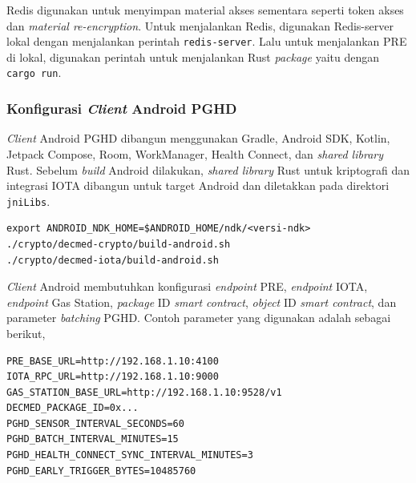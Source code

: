 

Redis digunakan untuk menyimpan material akses sementara seperti token akses dan \textit{material re-encryption}. 
Untuk menjalankan Redis, digunakan Redis-server lokal dengan menjalankan perintah \texttt{redis-server}.
Lalu untuk menjalankan PRE di lokal, digunakan perintah untuk menjalankan Rust \textit{package} yaitu dengan \texttt{cargo run}.

\subsubsection{Konfigurasi \textit{Client} Android PGHD}

\textit{Client} Android PGHD dibangun menggunakan Gradle, Android SDK, Kotlin, Jetpack Compose, Room, WorkManager, Health Connect, dan \textit{shared library} Rust. 
Sebelum \textit{build} Android dilakukan, \textit{shared library} Rust untuk kriptografi dan integrasi IOTA dibangun untuk target Android dan diletakkan pada direktori \texttt{jniLibs}.

\begin{lstlisting}[caption={\textit{Build} \textit{Shared Library} Rust untuk Android}, label={lst:build-shared-library-android}, float=htb]
export ANDROID_NDK_HOME=$ANDROID_HOME/ndk/<versi-ndk>
./crypto/decmed-crypto/build-android.sh
./crypto/decmed-iota/build-android.sh
\end{lstlisting}

\textit{Client} Android membutuhkan konfigurasi \textit{endpoint} PRE, \textit{endpoint} IOTA, \textit{endpoint} Gas Station, \textit{package} ID \textit{smart contract}, \textit{object} ID \textit{smart contract}, dan parameter \textit{batching} PGHD\@.
Contoh parameter yang digunakan adalah sebagai berikut,

\begin{lstlisting}[caption={Konfigurasi \textit{client} Android PGHD}, label={lst:konfigurasi-android-pghd}, float=htb]
PRE_BASE_URL=http://192.168.1.10:4100
IOTA_RPC_URL=http://192.168.1.10:9000
GAS_STATION_BASE_URL=http://192.168.1.10:9528/v1
DECMED_PACKAGE_ID=0x...
PGHD_SENSOR_INTERVAL_SECONDS=60
PGHD_BATCH_INTERVAL_MINUTES=15
PGHD_HEALTH_CONNECT_SYNC_INTERVAL_MINUTES=3
PGHD_EARLY_TRIGGER_BYTES=10485760
\end{lstlisting}

